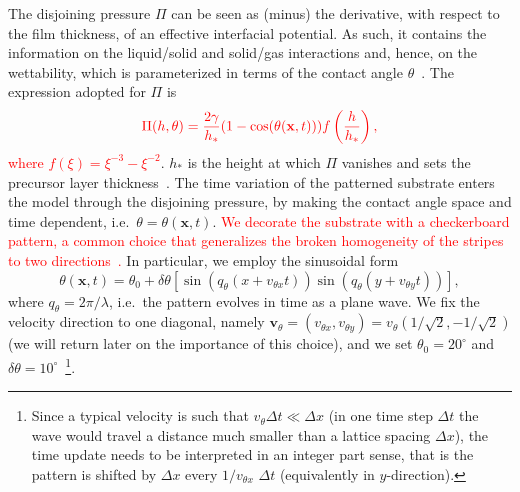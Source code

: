 \documentclass[twocolumn,amsmath,amssymb,showpacs,prl,superscriptaddress]{revtex4-1} %
\newcommand{\REV}[1]{\textcolor{red}{#1}}
\begin{document}
The disjoining pressure $\Pi$ can be seen as (minus) the derivative, with respect to the film thickness, of an effective interfacial potential.
As such, it contains the information on the liquid/solid and solid/gas interactions and, hence, on the wettability, which is parameterized in terms of the contact angle $\theta$~\cite{RevModPhys.81.739, SCHWARTZ1998173}. 
The expression adopted for $\Pi$ is
\begin{equation}\label{eq:disjoinpressure}
\REV{\Pi(h,\theta) = \frac{2\gamma}{h_{\ast}}(1-\cos(\theta(\mathbf{x},t)))
  f\left(\frac{h}{h_{\ast}}\right),}
\end{equation}
\REV{where $f(\xi)=\xi^{-3} - \xi^{-2}$}. $h_{\ast}$ is the height at which $\Pi$ vanishes and sets the precursor layer thickness~\cite{SuppMat}.
The time variation of the patterned substrate enters the model through the disjoining pressure, by making the contact angle space and time dependent, i.e.~$\theta = \theta(\mathbf{x},t)$.
\REV{We decorate the substrate with a checkerboard pattern, a common choice that generalizes the broken homogeneity of the stripes to two 
directions~\cite{Jalali2018,Nagayama2020,Das2020}.}
In particular, we employ the sinusoidal form
\begin{equation}\label{eq:sinetheta}
   \!\! \theta(\mathbf{x},t) = \theta_0 + \delta\theta\left[\sin\left(q_{\theta} (x+v_{\theta x}t)\right)\sin\left(q_{\theta}(y+v_{\theta y}t)\right)\right],\! 
\end{equation}
where $q_{\theta} = 2\pi/\lambda$, i.e.~the pattern evolves in time as a plane wave.
We fix the velocity direction to one diagonal, namely $\mathbf{v}_{\theta} = (v_{\theta x},v_{\theta y}) = v_{\theta}(1/\sqrt{2},-1/\sqrt{2})$ (we will return later on the importance of this choice), and we set $\theta_0 = 20^{\circ}$ and $\delta\theta=10^{\circ}$~\footnote{Since a typical velocity is such that $v_{\theta} \Delta t \ll \Delta x$ (in one time step $\Delta t$ the wave would travel a distance much smaller than a lattice spacing $\Delta x$),
the time update needs to be interpreted in an integer part sense, that is the pattern is shifted by $\Delta x$ every $1/v_{\theta x}$ $\Delta t$ (equivalently in $y$-direction).}.
\end{document}
